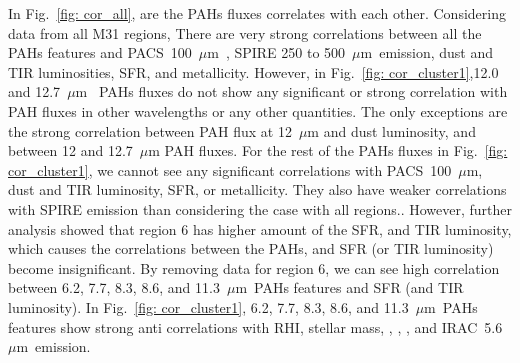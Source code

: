         In Fig.~\ref{fig: cor_all}, are the PAHs fluxes correlates with each other. 
        Considering data from all M31 regions, There are very strong correlations between all the PAHs features and PACS~100~$\mu$m~, SPIRE 250 to 500~$\mu$m~emission, dust and TIR luminosities, SFR, and metallicity.
        However, in Fig.~\ref{fig: cor_cluster1},12.0 and 12.7~$\mu$m~ PAHs fluxes do not show any significant or strong correlation with PAH fluxes in other wavelengths or any other quantities.
        The only exceptions are the strong correlation between PAH flux at 12~$\mu$m and dust luminosity, and between 12 and 12.7~$\mu$m PAH fluxes.
        For the rest of the PAHs fluxes in Fig.~\ref{fig: cor_cluster1}, we cannot see any significant correlations with PACS~100~$\mu$m, dust and TIR luminosity, SFR, or metallicity.
        They also have weaker correlations with SPIRE emission than considering the case with all regions..
        However, further analysis showed that region 6 has higher amount of the SFR, and TIR luminosity, which causes the correlations between the PAHs, and SFR (or TIR luminosity) become insignificant. 
        By removing data for region 6, we can see high correlation between 6.2, 7.7, 8.3, 8.6, and 11.3~$\mu$m~PAHs features and SFR (and TIR luminosity).
        In Fig.~\ref{fig: cor_cluster1}, 6.2, 7.7, 8.3, 8.6, and 11.3~$\mu$m~PAHs features show strong anti correlations with RHI, stellar mass, \halpha, \sii, \oiii, and IRAC~5.6~$\mu$m~emission.
        
        
        
        
